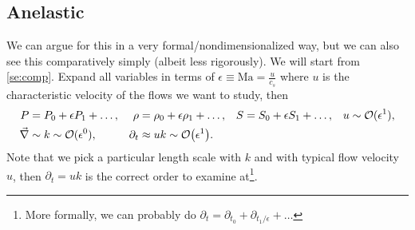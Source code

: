 \documentclass[11pt,
        usenames, %
        dvipsnames %
    ]{article}
\DeclarePairedDelimiter\p{\lparen}{\rparen}
\begin{document}
\subsection{Anelastic}

We can argue for this in a very formal/nondimensionalized way, but we can also
see this comparatively simply (albeit less rigorously). We will start from
\autoref{se:comp}. Expand all variables in terms of $\epsilon \equiv \mathrm{Ma}
= \frac{u}{c_s}$ where $u$ is the characteristic velocity of the flows we want
to study, then
\begin{align*}
    P &= P_0 + \epsilon P_1 + \dots,& \rho &= \rho_0 + \epsilon \rho_1 + \dots,&
        S &= S_0 + \epsilon S_1 + \dots,& u &\sim \mathcal{O}(\epsilon^1),\\
    \vec{\nabla} &\sim k \sim \mathcal{O}(\epsilon^0) ,&
        \partial_t &\approx uk \sim \mathcal{O}\p*{\epsilon^1}.
\end{align*}
Note that we pick a particular length scale with $k$ and with typical flow
velocity $u$, then $\partial_t = uk$ is the correct order to examine
at\footnote{More formally, we can probably do $\partial_t = \partial_{t_0} +
\partial_{t_1/\epsilon} + \dots$}.
\end{document}
